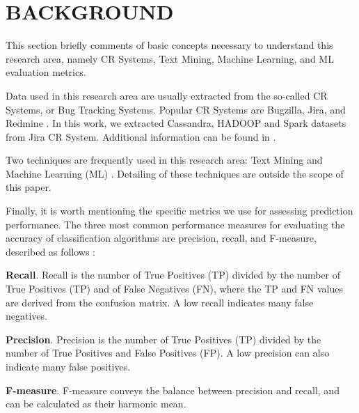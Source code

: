 \section{BACKGROUND} \label{sec:background} 
 

This section briefly comments of basic concepts necessary to understand this research area, namely CR Systems, Text Mining, Machine Learning, and ML evaluation metrics.

Data used in this research area are usually extracted from the so-called CR Systems, or Bug Tracking Systems. Popular CR Systems are Bugzilla, Jira, and Redmine \cite{Tian2012}. In this work, we extracted Cassandra, HADOOP and Spark datasets from Jira CR System. Additional information can be found in \cite{Pressman2009}.

Two techniques are frequently used in this research area: Text Mining  \cite{Feldman2007} \cite{Williams2011} and Machine Learning (ML) \cite{Williams2011} \cite{Surya2016} \cite{Russell2010} \cite{Breiman2001}. Detailing of these techniques are outside the scope of this paper.

Finally, it is worth mentioning the specific metrics we use for assessing prediction performance. The three most common performance measures for evaluating the accuracy of classification algorithms are precision, recall, and F-measure, described as follows \cite{Facelli2015} \cite{Zhao2013}:

\textbf{Recall}. Recall is the number of True Positives (TP) divided by the number of True Positives (TP) and of False Negatives (FN), where the TP and FN values are derived from the confusion matrix. A low recall indicates many false negatives.

\textbf{Precision}. Precision is the number of True Positives (TP) divided by the number of True Positives and False Positives (FP). A low precision can also indicate many false positives.

\textbf{F-measure}. F-measure conveys the balance between precision and recall, and can be calculated as their harmonic mean. 


